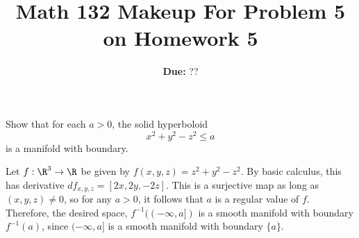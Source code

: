 \documentclass[11pt,letterpaper]{article}
\title{\textbf{Math 132 Makeup For Problem 5 on Homework 5}}
\date{\textbf{Due:} ??}
\begin{document}
\maketitle

\begin{problem}
    Show that for each $a > 0$, the solid hyperboloid
    \[
    x^2+y^2-z^2 \leq a
    \]
    is a manifold with boundary.
\end{problem}
\quad Let $f: \R^3 \to \R$ be given by $f(x,y,z)=z^2+y^2-z^2$. By basic calculus, this has derivative $df_{x,y,z} = [2x,2y,-2z]$. This is a surjective map as long as $(x,y,z)\neq 0$, so for any $a>0$, it follows that $a$ is a regular value of $f$. Therefore, the desired space, $f^{-1}((-\infty, a])$ is a smooth manifold with boundary $f^{-1}(a)$, since $(-\infty, a]$ is a smooth manifold with boundary $\{a\}$.
\end{document}
